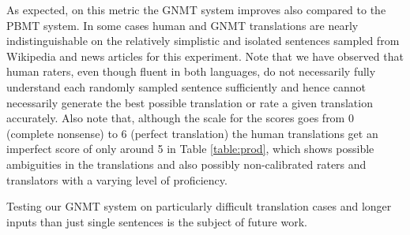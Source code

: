 As expected, on this metric the GNMT system improves also compared to the PBMT
system. In some cases human and GNMT translations are
nearly indistinguishable on the relatively simplistic and isolated sentences
sampled from Wikipedia and news articles for this experiment. Note that we have
observed that human raters, even though fluent in both languages, do not
necessarily fully understand each randomly sampled sentence sufficiently and 
hence cannot necessarily generate the best possible translation or rate a 
given translation accurately. Also note that, although the scale for the
scores goes from
0 (complete nonsense) to 6 (perfect translation) the human translations
get an imperfect score of only around 5 in Table \ref{table:prod}, which shows
possible ambiguities in the translations and also possibly non-calibrated raters
and translators with a varying level of proficiency.

Testing our GNMT system on particularly difficult translation cases and longer
inputs than just single sentences is the subject of future work.








